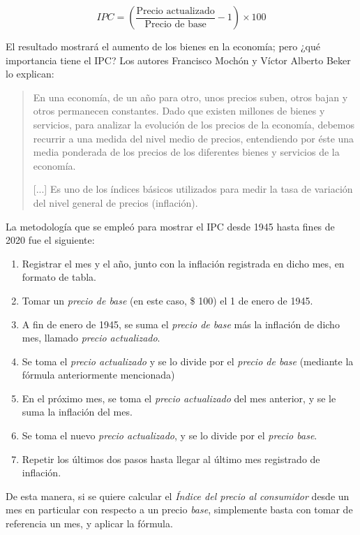 \documentclass[12pt,a4paper,twoside]{book}
\begin{document}
\begin{equation}
IPC = \left( \dfrac{\text{Precio actualizado}}{\text{Precio de base}} - 1 \right) \times 100
\end{equation}

El resultado mostrará el aumento de los bienes en la economía; pero ¿qué importancia tiene el IPC? Los autores Francisco Mochón y Víctor Alberto Beker lo explican:

\begin{quotation}
En una economía, de un año para otro, unos precios suben, otros bajan y otros permanecen constantes. Dado que existen millones de bienes y servicios, para analizar la evolución de los precios de la economía, debemos recurrir a una medida del nivel medio de precios, entendiendo por éste una media ponderada de los precios de los diferentes bienes y servicios de la economía.

[...] Es uno de los índices básicos utilizados para medir la tasa de variación del nivel general de precios (inflación). \cite[pág. 184]{mochobeker}
\end{quotation}

La metodología que se empleó para mostrar el IPC desde 1945 hasta fines de 2020 fue el siguiente:

\begin{enumerate}
\item Registrar el mes y el año, junto con la inflación registrada en dicho mes, en formato de tabla.
\item Tomar un \textit{precio de base} (en este caso, \$ 100) el 1 de enero de 1945.
\item A fin de enero de 1945, se suma el \textit{precio de base} más la inflación de dicho mes, llamado \textit{precio actualizado}.
\item Se toma el \textit{precio actualizado} y se lo divide por el \textit{precio de base} (mediante la fórmula anteriormente mencionada)
\item En el próximo mes, se toma el \textit{precio actualizado} del mes anterior, y se le suma la inflación del mes.
\item Se toma el nuevo \textit{precio actualizado}, y se lo divide por el \textit{precio base}.
\item Repetir los últimos dos pasos hasta llegar al último mes registrado de inflación.
\end{enumerate}

De esta manera, si se quiere calcular el \textit{Índice del precio al consumidor} desde un mes en particular con respecto a un precio \textit{base}, simplemente basta con tomar de referencia un mes, y aplicar la fórmula.
\end{document}
